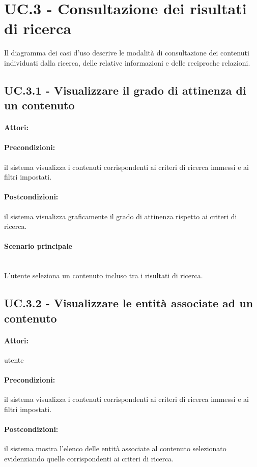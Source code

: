 \documentclass[10pt,a4paper,headinclude,footinclude,hidelinks]{scrreprt} %
\begin{document}
	\section{UC.3 - Consultazione dei risultati di ricerca}
	\label{ch:stage:ar:uc:3}
	Il diagramma dei casi d'uso descrive le modalità di consultazione dei contenuti individuati dalla ricerca, delle relative informazioni e delle reciproche relazioni.

	\subsection[UC.3.1]{UC.3.1 - Visualizzare il grado di attinenza di un contenuto}
	\label{sec:stage:ar:uc:3_1}
	\paragraph{Attori:}
	\paragraph{Precondizioni:} il sistema visualizza i contenuti corrispondenti ai criteri di ricerca immessi e ai filtri impostati.
	\paragraph{Postcondizioni:} il sistema visualizza graficamente il grado di attinenza rispetto ai criteri di ricerca.
	\paragraph{Scenario principale} \hfill \\
	L'utente seleziona un contenuto incluso tra i risultati di ricerca.

	\subsection[UC.3.2]{UC.3.2 - Visualizzare le entità associate ad un contenuto}
	\label{sec:stage:ar:uc:3_2}
	\paragraph{Attori:} utente
	\paragraph{Precondizioni:} il sistema visualizza i contenuti corrispondenti ai criteri di ricerca immessi e ai filtri impostati.
	\paragraph{Postcondizioni:} il sistema mostra l'elenco delle entità associate al contenuto selezionato evidenziando quelle corrispondenti ai criteri di ricerca.
\end{document}
